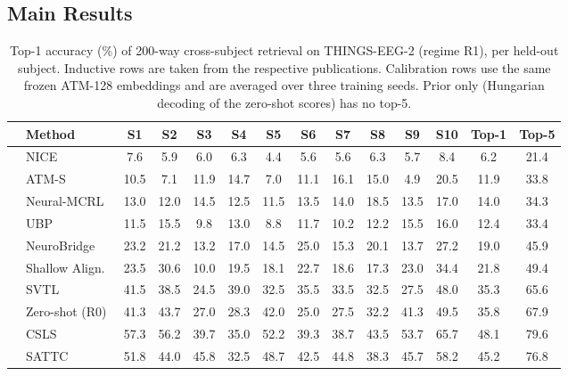 \documentclass[10pt,twocolumn,letterpaper]{article}
\begin{document}
\subsection{Main Results}
\label{sec:r1}

\begin{table}[t]
\caption{Top-1 accuracy (\%) of 200-way cross-subject retrieval on THINGS-EEG-2 (regime R1), per held-out subject. Inductive rows are taken from the respective publications. Calibration rows use the same frozen ATM-128 embeddings and are averaged over three training seeds. Prior only (Hungarian decoding of the zero-shot scores) has no top-5.}
\label{tab:main}
\centering
\small
\setlength{\tabcolsep}{4.2pt}
\begin{tabular}{@{}llcccccccccccc@{}}
\toprule
 & Method & S1 & S2 & S3 & S4 & S5 & S6 & S7 & S8 & S9 & S10 & Top-1 & Top-5 \\
\midrule
{}
 & NICE~\cite{song2024nice} & 7.6 & 5.9 & 6.0 & 6.3 & 4.4 & 5.6 & 5.6 & 6.3 & 5.7 & 8.4 & 6.2 & 21.4 \\
 & ATM-S~\cite{li2024atm} & 10.5 & 7.1 & 11.9 & 14.7 & 7.0 & 11.1 & 16.1 & 15.0 & 4.9 & 20.5 & 11.9 & 33.8 \\
 & Neural-MCRL~\cite{li2024mcrl} & 13.0 & 12.0 & 14.5 & 12.5 & 11.5 & 13.5 & 14.0 & 18.5 & 13.5 & 17.0 & 14.0 & 34.3 \\
 & UBP~\cite{wu2025ubp} & 11.5 & 15.5 & 9.8 & 13.0 & 8.8 & 11.7 & 10.2 & 12.2 & 15.5 & 16.0 & 12.4 & 33.4 \\
 & NeuroBridge~\cite{zhang2025neurobridge} & 23.2 & 21.2 & 13.2 & 17.0 & 14.5 & 25.0 & 15.3 & 20.1 & 13.7 & 27.2 & 19.0 & 45.9 \\
 & Shallow Align.~\cite{du2025shallow} & 23.5 & 30.6 & 10.0 & 19.5 & 18.1 & 22.7 & 18.6 & 17.3 & 23.0 & 34.4 & 21.8 & 49.4 \\
 & SVTL~\cite{yadav2026svtl} & 41.5 & 38.5 & 24.5 & 39.0 & 32.5 & 35.5 & 33.5 & 32.5 & 27.5 & 48.0 & 35.3 & 65.6 \\
\midrule
{}
 & Zero-shot (R0) & 41.3 & 43.7 & 27.0 & 28.3 & 42.0 & 25.0 & 27.5 & 32.2 & 41.3 & 49.5 & 35.8 & 67.9 \\
 & CSLS & 57.3 & 56.2 & 39.7 & 35.0 & 52.2 & 39.3 & 38.7 & 43.5 & 53.7 & 65.7 & 48.1 & 79.6 \\
 & SATTC~\cite{huang2026sattc} & 51.8 & 44.0 & 45.8 & 32.5 & 48.7 & 42.5 & 44.8 & 38.3 & 45.7 & 58.2 & 45.2 & 76.8 \\

\end{tabular}
\end{table}
\end{document}
